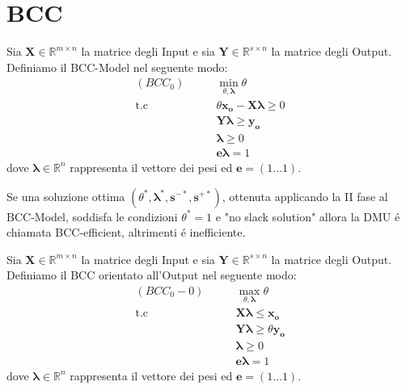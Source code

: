 \section{BCC}
\bigskip
\begin{definiz}
Sia $\boldsymbol{X} \in \mathbb{R}^{m \times n}$ la matrice degli Input e sia $\boldsymbol{Y} \in \mathbb{R}^{s \times n}$  la matrice degli Output. Definiamo il BCC-Model nel seguente modo:
\begin{equation}
\begin{split}
(BCC_0) \qquad & \min_{\theta, \boldsymbol{\lambda}} \theta \\
\text{t.c} \qquad & \theta\boldsymbol{x_o} - \boldsymbol{X\lambda} \geq 0 \\
& \boldsymbol{Y\lambda} \geq \boldsymbol{y_o} \\
& \boldsymbol{\lambda} \geq 0 \\
& \boldsymbol{e\lambda} = 1
\end{split}
\end{equation}
dove $\boldsymbol{\lambda} \in \mathbb{R}^{n}$ rappresenta il vettore dei pesi ed $\boldsymbol{e} = (1 \dots 1)$.
\end{definiz}
\begin{definiz}
Se una soluzione ottima $(\theta^{*}, \boldsymbol{\lambda^{*}, s^{-*}, s^{+*}})$, ottenuta applicando la II fase al BCC-Model, soddisfa le condizioni $\theta^{*} = 1$ e "no slack solution" allora la DMU \'e chiamata BCC-efficient, altrimenti \'e inefficiente. 
\end{definiz}
\begin{definiz}
Sia $\boldsymbol{X} \in \mathbb{R}^{m \times n}$ la matrice degli Input e sia $\boldsymbol{Y} \in \mathbb{R}^{s \times n}$  la matrice degli Output. Definiamo il BCC orientato all'Output nel seguente modo:
\begin{equation}
\begin{split}
(BCC_0-0) \qquad & \max_{\theta, \boldsymbol{\lambda}} \theta \\
\text{t.c} \qquad & \boldsymbol{X\lambda} \leq \boldsymbol{x_o} \\
& \boldsymbol{Y\lambda} \geq \theta\boldsymbol{y_o} \\
& \boldsymbol{\lambda} \geq 0 \\
& \boldsymbol{e\lambda} = 1
\end{split}
\end{equation}
dove $\boldsymbol{\lambda} \in \mathbb{R}^{n}$ rappresenta il vettore dei pesi ed $\boldsymbol{e} = (1 \dots 1)$.
\end{definiz}
